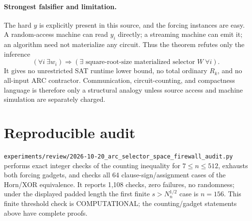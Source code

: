 \documentclass[11pt]{article}
\begin{document}
\paragraph{Strongest falsifier and limitation.}
The hard $y$ is explicitly present in this source, and the forcing instances
are easy.  A random-access machine can read $y_i$ directly; a streaming machine
can emit it; an algorithm need not materialize any circuit.  Thus the theorem
refutes only the inference
\[
(\forall i\ \exists w_i)\Longrightarrow
(\exists\text{ square-root-size materialized selector }W\ \forall i).
\]
It gives no unrestricted SAT runtime lower bound, no total ordinary $R_k$, and
no all-input ARC contractor.  Communication, circuit-counting, and compactness
language is therefore only a structural analogy unless source access and
machine simulation are separately charged.

\section*{Reproducible audit}
\texttt{experiments/review/2026-10-20\_arc\_selector\_space\_firewall\_audit.py}
performs exact integer checks of the counting inequality for $7\leq n\leq512$,
exhausts both forcing gadgets, and checks all 64 clause-sign/assignment cases of
the Horn/XOR equivalence.  It reports 1,108 checks, zero failures, no randomness;
under the displayed padded length the first finite
$s>N_n^{1/2}$ case is $n=156$.  This finite threshold check is COMPUTATIONAL;
the counting/gadget statements above have complete proofs.
\end{document}
